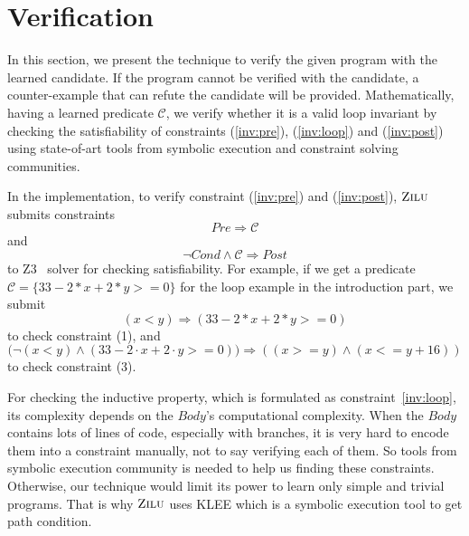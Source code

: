 
\section{Verification} %
\label{sec:verification}
In this section, we present the technique to verify the given program with the learned candidate.
If the program cannot be verified with the candidate, a counter-example that can refute the candidate will be provided.
Mathematically, having a learned predicate $\mathcal{C}$, we verify whether it is a valid loop invariant by
checking the satisfiability of constraints (\ref{inv:pre}), (\ref{inv:loop}) and (\ref{inv:post}) using state-of-art tools 
from symbolic execution and constraint solving communities.

In the implementation, to verify constraint (\ref{inv:pre}) and (\ref{inv:post}), 
$\textsc{Zilu}$ submits constraints 
$$Pre \Rightarrow \mathcal{C}$$ 
and 
$$\neg {Cond} \wedge \mathcal{C} \Rightarrow Post$$
to Z3~\cite{de2008z3} solver for checking satisfiability.
For example, if we get a predicate $\mathcal{C} = \{33-2*x+2*y>=0\}$
for the loop example in the introduction part, 
we submit 
$$(x<y) \Rightarrow (33-2*x+2*y>=0)$$
to check constraint (1), 
and 
$$\big(\neg(x<y) \wedge (33-2\cdot x+2\cdot y>=0)\big) \Rightarrow ((x >= y) \wedge (x <= y + 16))$$
to check constraint (3).

For checking the inductive property, which is formulated as constraint~\ref{inv:loop},
its complexity depends on the $Body$'s computational complexity.
When the $Body$ contains lots of lines of code, especially with branches, 
it is very hard to encode them into a constraint manually,
not to say verifying each of them.
So tools from symbolic execution community is needed to help us finding these constraints.
Otherwise, our technique would limit its power to learn only simple and trivial programs. 
That is why $\textsc{Zilu}$ uses KLEE\cite{cadar2008klee} which is a symbolic execution tool to get path condition.

